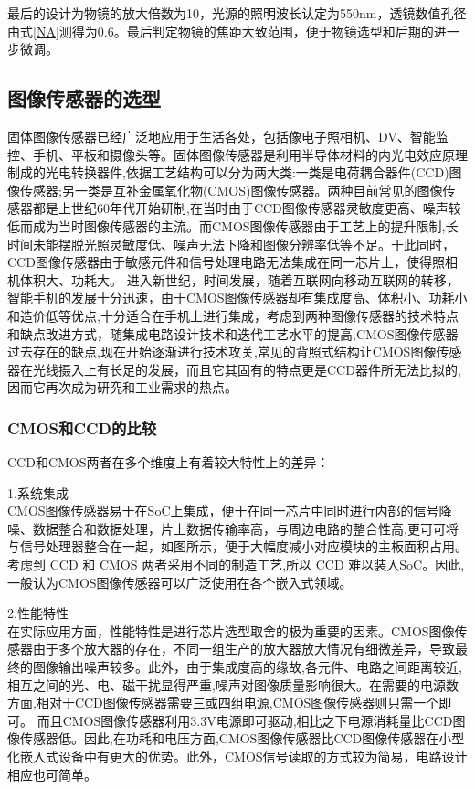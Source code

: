 最后的设计为物镜的放大倍数为10，光源的照明波长认定为550nm，透镜数值孔径由式\ref{NA}测得为0.6。最后判定物镜的焦距大致范围，便于物镜选型和后期的进一步微调。

\subsection{图像传感器的选型}
固体图像传感器已经广泛地应用于生活各处，包括像电子照相机、DV、智能监控、手机、平板和摄像头等。固体图像传感器是利用半导体材料的内光电效应原理制成的光电转换器件,依据工艺结构可以分为两大类:一类是电荷耦合器件(CCD)图像传感器;另一类是互补金属氧化物(CMOS)图像传感器。两种目前常见的图像传感器都是上世纪60年代开始研制,在当时由于CCD图像传感器灵敏度更高、噪声较低而成为当时图像传感器的主流。而CMOS图像传感器由于工艺上的提升限制,长时间未能摆脱光照灵敏度低、噪声无法下降和图像分辨率低等不足。于此同时，CCD图像传感器由于敏感元件和信号处理电路无法集成在同一芯片上，使得照相机体积大、功耗大\cite{CCDCMOSf}。
进入新世纪，时间发展，随着互联网向移动互联网的转移，智能手机的发展十分迅速，由于CMOS图像传感器却有集成度高、体积小、功耗小和造价低等优点,十分适合在手机上进行集成，考虑到两种图像传感器的技术特点和缺点改进方式，随集成电路设计技术和迭代工艺水平的提高,CMOS图像传感器过去存在的缺点,现在开始逐渐进行技术攻关,常见的背照式结构让CMOS图像传感器在光线摄入上有长足的发展，而且它其固有的特点更是CCD器件所无法比拟的,因而它再次成为研究和工业需求的热点。
\subsubsection{CMOS和CCD的比较}
CCD和CMOS两者在多个维度上有着较大特性上的差异：

1.系统集成 \\

CMOS图像传感器易于在SoC上集成，便于在同一芯片中同时进行内部的信号降噪、数据整合和数据处理，片上数据传输率高，与周边电路的整合性高,更可可将与信号处理器整合在一起，如图所示，便于大幅度减小对应模块的主板面积占用。考虑到 CCD 和 CMOS 两者采用不同的制造工艺,所以 CCD 难以装入SoC。因此,一般认为CMOS图像传感器可以广泛使用在各个嵌入式领域。

2.性能特性\\

在实际应用方面，性能特性是进行芯片选型取舍的极为重要的因素。CMOS图像传感器由于多个放大器的存在，不同一组生产的放大器放大情况有细微差异，导致最终的图像输出噪声较多。此外，由于集成度高的缘故,各元件、电路之间距离较近,相互之间的光、电、磁干扰显得严重,噪声对图像质量影响很大。在需要的电源数方面,相对于CCD图像传感器需要三或四组电源,CMOS图像传感器则只需一个即可。
而且CMOS图像传感器利用3.3V电源即可驱动,相比之下电源消耗量比CCD图像传感器低。因此,在功耗和电压方面,CMOS图像传感器比CCD图像传感器在小型化嵌入式设备中有更大的优势。此外，CMOS信号读取的方式较为简易，电路设计相应也可简单。

